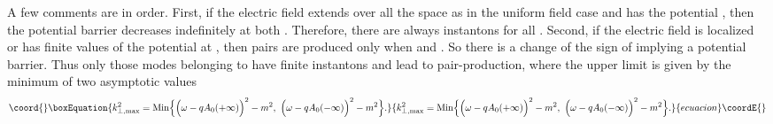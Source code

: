 \documentclass[a4paper,prd,showpacs,preprintnumbers,amsmath,amssymb]{revtex4}
\begin{document}
A few comments are in order. First, if the electric field extends
over all the space as in the uniform field case and has the
potential \coordHE{}, then the
potential barrier decreases indefinitely at both \myHighlight{$\pm \infty$}\coordHE{}.
Therefore, there are always instantons for all \coordHE{}.
Second, if the electric field is localized or has finite values of
the potential at \myHighlight{$\pm \infty$}\coordHE{}, then pairs are produced only when
\coordHE{} and \coordHE{}. So there is a change of the sign of \coordHE{} implying a potential barrier. Thus only those
modes belonging to \coordHE{} have finite instantons and lead to pair-production,
where the upper limit is given by the minimum of two asymptotic
values
\begin{equation}\coord{}\boxEquation{
{k}_{\perp, {\rm max}}^2 = {\rm Min} \Bigl\{ \Bigl(\omega - q A_0
(+ \infty) \Bigr)^2 - m^2, ~\Bigl(\omega - q A_0 (- \infty)
\Bigr)^2 - m^2 \Bigr\}.
}{
{k}_{\perp, {\rm max}}^2 = {\rm Min} \Bigl\{ \Bigl(\omega - q A_0
(+ \infty) \Bigr)^2 - m^2, ~\Bigl(\omega - q A_0 (- \infty)
\Bigr)^2 - m^2 \Bigr\}.
}{ecuacion}\coordE{}\end{equation}
\end{document}
